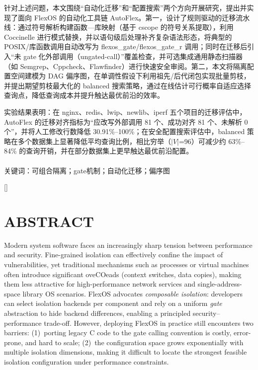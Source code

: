 \documentclass[UTF8,a4paper,12pt,twoside]{ctexart}  %
\newcommand{\timesnewroman}{\setmainfont[
AutoFakeBold=2,
Path=Font/
]{times}}
\begin{document}
针对上述问题，本文围绕``自动化迁移''和``配置搜索''两个方向开展研究，提出并实现了面向
FlexOS 的自动化工具链
AutoFlex。第一，设计了规则驱动的迁移流水线：通过符号解析构建函数—库映射（基于
cscope 的符号关系提取）\cite{14}，利用 Coccinelle
进行模式替换\cite{10}，并以语句级后处理补齐复杂语法形态，将典型的
POSIX/库函数调用自动改写为 flexos\_gate/flexos\_gate\_r
调用；同时在迁移后引入``未 gate
化外部调用（ungated-call）''覆盖检查，并可选集成通用静态扫描器（如
Semgrep、Cppcheck、Flawfinder）进行快速安全审阅\cite{11,12,13}。第二，本文将隔离配置空间建模为
DAG
偏序图，在单调性假设下利用祖先/后代闭包实现批量剪枝，并提出期望剪枝最大化的
balanced
搜索策略，通过在线估计可行概率自适应选择查询点，降低查询成本并提升触达最优前沿的效率。

实验结果表明：在
nginx\cite{15}、redis\cite{16}、lwip、newlib、iperf\cite{17}
五个项目的迁移评估中，AutoFlex 的迁移对齐指标为``应改写外部调用 81
个、成功对齐 81 个、未解析 0 个''，并将人工修改行数降低
30.91\%--100\%；在安全配置搜索评估中，balanced
策略在多个数据集上显著降低平均查询比例，相比穷举（$|V|$=96）可减少约
63\%--84\% 的查询开销，并在部分数据集上更早触达最优前沿配置。\\
~\\
{\heiti {}关键词}：可组合隔离；gate机制；自动化迁移；偏序图\\

\cleardoublepage

\newpage
{}

\titleformat{\section}[block]{\centering\bfseries\timesnewroman\fontsize{16pt}{20pt}\selectfont}{\thesection}{1em}{}[]

\section*{ABSTRACT}
Modern system software faces an increasingly sharp tension between
performance and security. Fine-grained isolation can effectively confine
the impact of vulnerabilities, yet traditional mechanisms such
as processes or virtual machines often introduce significant oveCOeads
(context switches, data copies), making them less attractive for
high-performance network services and single-address-space library OS
scenarios. FlexOS advocates \emph{composable isolation}: developers can
select isolation backends per component and rely on a uniform
\emph{gate} abstraction to hide backend differences, enabling a
principled security--performance trade-off. However, deploying FlexOS in
practice still encounters two barriers: (1)~porting legacy C code to the
gate calling convention is costly, error-prone, and hard to scale; (2)~the
configuration space grows exponentially with multiple isolation
dimensions, making it difficult to locate the strongest feasible
isolation configuration under performance constraints.
\end{document}
